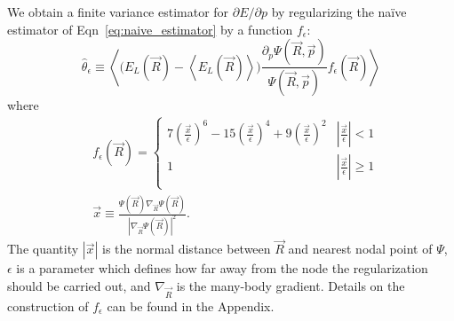 \documentclass[twocolumn]{revtex4-1}
\begin{document}
We obtain a finite variance estimator for $\partial E/\partial p$ by regularizing the na\"ive estimator of Eqn~\ref{eq:naive_estimator} by a function $f_\epsilon$:
\begin{equation}
\hat{\theta}_\epsilon \equiv \left\langle \Big(E_L(\vec{R})  - \left\langle E_L(\vec{R}) \right \rangle\Big)\frac{\partial_p \Psi(\vec{R}, \vec{p})}{\Psi(\vec{R}, \vec{p})} f_\epsilon(\vec{R}) \right\rangle
\label{eq:regularized_estimator}
\end{equation}
where 
\begin{equation}
\begin{split}
&f_\epsilon(\vec{R}) = \begin{cases} 
     7(\frac{\vec{x}}{\epsilon})^6 - 15(\frac{\vec{x}}{\epsilon})^4 + 9(\frac{\vec{x}}{\epsilon})^2 & |\frac{\vec{x}}{\epsilon}| < 1 \\
      1 & |\frac{\vec{x}}{\epsilon}| \ge 1 \\
   \end{cases}\\ 
 &\vec{x} \equiv \frac{\Psi(\vec{R}) \nabla_{\vec{R}} \Psi(\vec{R})}{|\nabla_{\vec{R}} \Psi(\vec{R})|^2}.
\end{split}
\label{eq:regularizing_function}
\end{equation} 
The quantity $|\vec{x}|$ is the normal distance between $\vec{R}$ and nearest nodal point of $\Psi$, $\epsilon$ is a parameter which defines how far away from the node the regularization should be carried out, and $\nabla_{\vec{R}}$ is the many-body gradient.
Details on the construction of $f_\epsilon$ can be found in the Appendix.
\end{document}
